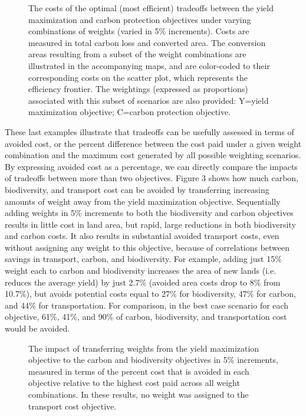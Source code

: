\documentclass[a4paper]{article}
\begin{document}
{\begin{figure}[!ht]
  \begin{center}
    \caption{The costs of the optimal (most efficient) tradeoffs between the yield maximization and carbon protection objectives under varying  combinations of weights (varied in 5\% increments). Costs are measured in total carbon loss and converted area. The conversion areas resulting from a subset of the weight combinations are illustrated in the accompanying maps, and are color-coded to their corresponding costs on the scatter plot, which represents the efficiency frontier. The weightings (expressed as proportions) associated with this subset of scenarios are also provided: Y=yield maximization objective; C=carbon protection objective.}
    \label{default}
  \end{center}
\end{figure}

These last examples illustrate that tradeoffs can be usefully assessed in terms of avoided cost, or the percent difference between the cost paid under a given weight combination and the maximum cost generated by all possible weighting scenarios. By expressing avoided cost as a percentage, we can directly compare the impacts of tradeoffs between more than two objectives. Figure 3 shows how much carbon, biodiversity, and transport cost can be avoided by transferring increasing amounts of weight away from the yield maximization objective. Sequentially adding weights in 5\% increments to both the biodiversity and carbon objectives results in little cost in land area, but rapid, large reductions in both biodiversity and carbon costs. It also results in substantial avoided transport costs, even without assigning any weight to this objective, because of correlations between savings in transport, carbon, and biodiversity. For example, adding just 15\% weight each to carbon and biodiversity increases the area of new lands (i.e. reduces the average yield) by just 2.7\% (avoided area costs drop to 8\% from 10.7\%), but avoids potential costs equal to 27\% for biodiversity, 47\% for carbon, and 44\% for transportation. For comparison, in the best case  scenario for each objective, 61\%, 41\%, and 90\% of carbon, biodiversity, and transportation cost would be avoided.   

\begin{figure}[!ht]
  \begin{center}
    \caption{The impact of transferring weights from the yield maximization objective to the carbon and biodiversity objectives in 5\% increments, measured in terms of the percent cost that is avoided in each objective relative to the highest cost paid across all weight combinations. In these results, no weight was assigned to the transport cost objective.}
    \label{default}
  \end{center}
\end{figure}

}
\end{document}
